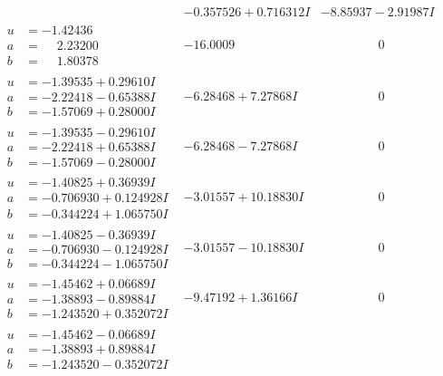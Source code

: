 \documentclass[1p]{elsarticle_modified}
\theoremstyle{definition}
\begin{document}
$$\begin{array}{c|c|c}
 & -0.357526 + 0.716312 I & -8.85937 - 2.91987 I \\ \hline\begin{aligned}
u &= -1.42436\phantom{ +0.000000I} \\
a &= \phantom{-}2.23200\phantom{ +0.000000I} \\
b &= \phantom{-}1.80378\phantom{ +0.000000I}\end{aligned}
 & -16.0009\phantom{ +0.000000I} & \phantom{-0.000000 } 0 \\ \hline\begin{aligned}
u &= -1.39535 + 0.29610 I \\
a &= -2.22418 - 0.65388 I \\
b &= -1.57069 + 0.28000 I\end{aligned}
 & -6.28468 + 7.27868 I & \phantom{-0.000000 } 0 \\ \hline\begin{aligned}
u &= -1.39535 - 0.29610 I \\
a &= -2.22418 + 0.65388 I \\
b &= -1.57069 - 0.28000 I\end{aligned}
 & -6.28468 - 7.27868 I & \phantom{-0.000000 } 0 \\ \hline\begin{aligned}
u &= -1.40825 + 0.36939 I \\
a &= -0.706930 + 0.124928 I \\
b &= -0.344224 + 1.065750 I\end{aligned}
 & -3.01557 + 10.18830 I & \phantom{-0.000000 } 0 \\ \hline\begin{aligned}
u &= -1.40825 - 0.36939 I \\
a &= -0.706930 - 0.124928 I \\
b &= -0.344224 - 1.065750 I\end{aligned}
 & -3.01557 - 10.18830 I & \phantom{-0.000000 } 0 \\ \hline\begin{aligned}
u &= -1.45462 + 0.06689 I \\
a &= -1.38893 - 0.89884 I \\
b &= -1.243520 + 0.352072 I\end{aligned}
 & -9.47192 + 1.36166 I & \phantom{-0.000000 } 0 \\ \hline\begin{aligned}
u &= -1.45462 - 0.06689 I \\
a &= -1.38893 + 0.89884 I \\
b &= -1.243520 - 0.352072 I\end{aligned}

\end{array}$$
\end{document}
